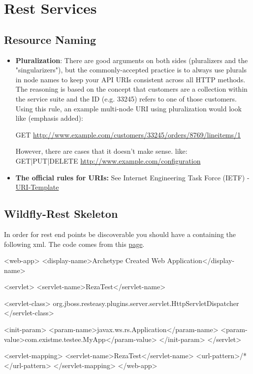 \section{Rest Services}
\subsection{Resource Naming}
\begin{itemize}
	\item \textbf{Pluralization}:\newline
		There are good arguments on both sides (pluralizers and the "singularizers"), but the commonly-accepted practice is to always use plurals in node names to keep your API URIs consistent across all HTTP methods. The reasoning is based on the concept that customers are a collection within the service suite and the ID (e.g. 33245) refers to one of those customers.
		Using this rule, an example multi-node URI using pluralization would look like (emphasis added):
		
		GET \url{http://www.example.com/customers/33245/orders/8769/lineitems/1}

		However, there are cases that it doesn't make sense. like:\newline
		GET|PUT|DELETE \url{http://www.example.com/configuration}
	\item \textbf{The official rules for URIs:}\newline
		See Internet Engineering Task Force (IETF) - \href{http://tools.ietf.org/html/rfc6570}{URI-Template}

\end{itemize}

\subsection{Wildfly-Rest Skeleton}
In order for rest end points be discoverable you should have a  containing the following xml. The code comes from this 
\href{http://docs.jboss.org/resteasy/docs/2.2.1.GA/userguide/html/Installation_Configuration.html}{page}.

\begin{xmlcode}
<web-app>
    <display-name>Archetype Created Web Application</display-name>

    <servlet>
        <servlet-name>RezaTest</servlet-name>

        <servlet-class>
            org.jboss.resteasy.plugins.server.servlet.HttpServletDispatcher
        </servlet-class>

        <init-param>
            <param-name>javax.ws.rs.Application</param-name>
            <param-value>com.existme.testee.MyApp</param-value>
        </init-param>
    </servlet>

    <servlet-mapping>
        <servlet-name>RezaTest</servlet-name>
        <url-pattern>/*</url-pattern>
    </servlet-mapping>
</web-app>
\end{xmlcode}

